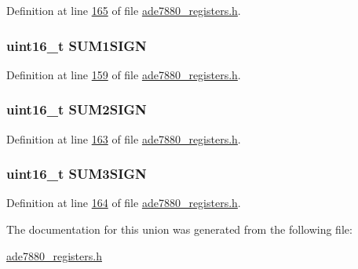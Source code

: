 Definition at line \hyperlink{a00036_source_l00165}{165} of file \hyperlink{a00036_source}{ade7880\-\_\-registers.\-h}.

\hypertarget{a00031_a435150f1cc3a4c23e4763a03af47cb8b}{
\subsubsection[{S\-U\-M1\-S\-I\-G\-N}]{\setlength{\rightskip}{0pt plus 5cm}uint16\-\_\-t S\-U\-M1\-S\-I\-G\-N}}\label{df/d61/a00031_a435150f1cc3a4c23e4763a03af47cb8b}


Definition at line \hyperlink{a00036_source_l00159}{159} of file \hyperlink{a00036_source}{ade7880\-\_\-registers.\-h}.

\hypertarget{a00031_a5eab599068b3048b2dc45f17c2af5105}{
\subsubsection[{S\-U\-M2\-S\-I\-G\-N}]{\setlength{\rightskip}{0pt plus 5cm}uint16\-\_\-t S\-U\-M2\-S\-I\-G\-N}}\label{df/d61/a00031_a5eab599068b3048b2dc45f17c2af5105}


Definition at line \hyperlink{a00036_source_l00163}{163} of file \hyperlink{a00036_source}{ade7880\-\_\-registers.\-h}.

\hypertarget{a00031_a20415eddc27299295b6c2b25df1b7bd0}{
\subsubsection[{S\-U\-M3\-S\-I\-G\-N}]{\setlength{\rightskip}{0pt plus 5cm}uint16\-\_\-t S\-U\-M3\-S\-I\-G\-N}}\label{df/d61/a00031_a20415eddc27299295b6c2b25df1b7bd0}


Definition at line \hyperlink{a00036_source_l00164}{164} of file \hyperlink{a00036_source}{ade7880\-\_\-registers.\-h}.



The documentation for this union was generated from the following file\-:\begin{DoxyCompactItemize}
\item 
\hyperlink{a00036}{ade7880\-\_\-registers.\-h}\end{DoxyCompactItemize}
